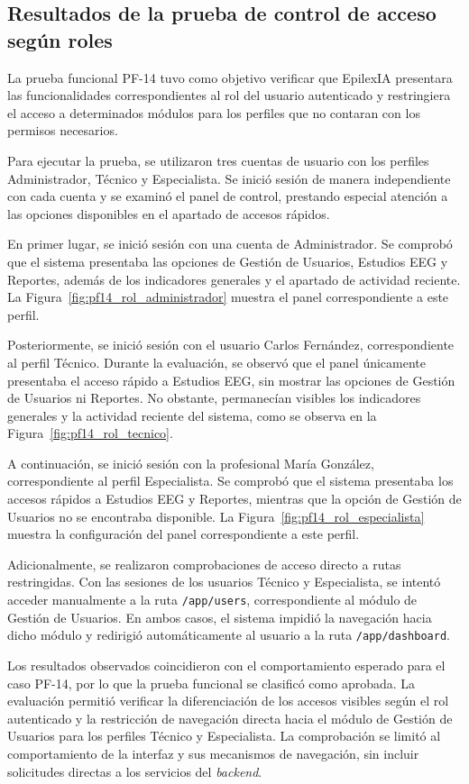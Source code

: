 \subsection{Resultados de la prueba de control de acceso según roles}

La prueba funcional PF-14 tuvo como objetivo verificar que EpilexIA presentara las funcionalidades correspondientes al rol del usuario autenticado y restringiera el acceso a determinados módulos para los perfiles que no contaran con los permisos necesarios.

Para ejecutar la prueba, se utilizaron tres cuentas de usuario con los perfiles Administrador, Técnico y Especialista. Se inició sesión de manera independiente con cada cuenta y se examinó el panel de control, prestando especial atención a las opciones disponibles en el apartado de accesos rápidos.

En primer lugar, se inició sesión con una cuenta de Administrador. Se comprobó que el sistema presentaba las opciones de Gestión de Usuarios, Estudios EEG y Reportes, además de los indicadores generales y el apartado de actividad reciente. La Figura~\ref{fig:pf14_rol_administrador} muestra el panel correspondiente a este perfil.

Posteriormente, se inició sesión con el usuario Carlos Fernández, correspondiente al perfil Técnico. Durante la evaluación, se observó que el panel únicamente presentaba el acceso rápido a Estudios EEG, sin mostrar las opciones de Gestión de Usuarios ni Reportes. No obstante, permanecían visibles los indicadores generales y la actividad reciente del sistema, como se observa en la Figura~\ref{fig:pf14_rol_tecnico}.

A continuación, se inició sesión con la profesional María González, correspondiente al perfil Especialista. Se comprobó que el sistema presentaba los accesos rápidos a Estudios EEG y Reportes, mientras que la opción de Gestión de Usuarios no se encontraba disponible. La Figura~\ref{fig:pf14_rol_especialista} muestra la configuración del panel correspondiente a este perfil.

Adicionalmente, se realizaron comprobaciones de acceso directo a rutas restringidas. Con las sesiones de los usuarios Técnico y Especialista, se intentó acceder manualmente a la ruta \texttt{/app/users}, correspondiente al módulo de Gestión de Usuarios. En ambos casos, el sistema impidió la navegación hacia dicho módulo y redirigió automáticamente al usuario a la ruta \texttt{/app/dashboard}.

Los resultados observados coincidieron con el comportamiento esperado para el caso PF-14, por lo que la prueba funcional se clasificó como aprobada. La evaluación permitió verificar la diferenciación de los accesos visibles según el rol autenticado y la restricción de navegación directa hacia el módulo de Gestión de Usuarios para los perfiles Técnico y Especialista. La comprobación se limitó al comportamiento de la interfaz y sus mecanismos de navegación, sin incluir solicitudes directas a los servicios del \textit{backend}.


